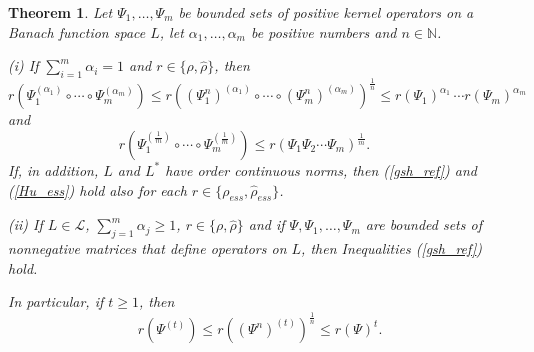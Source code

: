 \documentclass[12pt, reqno]{amsart}
\newtheorem{theorem}{Theorem}[section]
\theoremstyle{definition}
\theoremstyle{remark}
\numberwithin{equation}{section}
\newcommand{\be}{\begin{equation}}
\newcommand{\ee}{\end{equation}}
\newcommand{\NN}{\mathbb{N}}
\begin{document}
\begin{theorem} Let $\Psi _1, \ldots , \Psi _m$ be bounded sets of positive kernel operators on a Banach function space $L$, let
 $\alpha _1, \ldots , \alpha _m$ be positive numbers and $n \in \NN$.
 
\noindent (i) If
$\sum _{i=1} ^m \alpha _i = 1$ and $r \in \{\rho, \hat{\rho}\}$, then
\be
r (\Psi _1 ^{( \alpha _1)} \circ \cdots \circ \Psi _m ^{(\alpha _m)} ) \le  r ((\Psi _1 ^n ) ^{( \alpha _1)} \circ \cdots \circ (\Psi _m ^n) ^{(\alpha _m)} ) ^{ \frac{1}{n}} \le
r(\Psi _1)^{ \alpha _1} \, \cdots r(\Psi _m)^{\alpha _m}
\label{gsh_ref}
\ee
and
\be
r \left(\Psi _1 ^{\left( \frac{1}{m} \right)} \circ \cdots \circ \Psi _m  ^{\left( \frac{1}{m} \right)} \right) \le r(\Psi _1 \Psi _2 \cdots \Psi _m) ^{\frac{1}{m}}.\;\;\;\;\;\;\;\;
\label{Hu_ess}
\ee
If, in addition, $L$ and $L^*$ have order continuous norms, then (\ref{gsh_ref}) and (\ref{Hu_ess}) hold also  for each $r\in \{ \rho _{ess}, \hat{\rho} _{ess}\}$.

\noindent (ii) If $L\in\mathcal L$, $\sum_{j=1}^{m}\alpha_j\ge1$, $r \in \{\rho, \hat{\rho}\}$ and 
if $\Psi, \Psi _1, \ldots , \Psi _m$ are bounded sets of nonnegative matrices that define operators on $L$, 
then Inequalities (\ref{gsh_ref}) hold.

In particular, if $t\ge1$, then
\be
r (\Psi^{(t)})\le r((\Psi^n)^{(t)})^{\frac{1}{n}}\le r(\Psi)^{t}.
\label{folge}
\ee
\label{powers}
\end{theorem}
\end{document}
